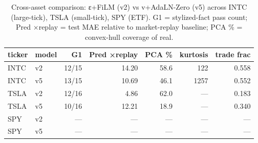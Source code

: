 \begin{table}
\caption{Cross-asset comparison: ε+FiLM (v2) vs v+AdaLN-Zero (v5) across INTC (large-tick), TSLA (small-tick), SPY (ETF). G1 = stylized-fact pass count; Pred ×replay = test MAE relative to market-replay baseline; PCA \% = convex-hull coverage of real.}
\label{tab:cross_asset}
\begin{tabular}{llrrrrr}
\toprule
ticker & model & G1 & Pred ×replay & PCA \% & kurtosis & trade frac \\
\midrule
INTC & v2 & 12/15 & 14.20 & 58.6 & 122 & 0.558 \\
INTC & v5 & 13/15 & 10.69 & 46.1 & 1257 & 0.552 \\
TSLA & v2 & 12/16 & 4.86 & 62.0 & — & 0.183 \\
TSLA & v5 & 10/16 & 12.21 & 18.9 & — & 0.340 \\
SPY & v2 & — & — & — & — & — \\
SPY & v5 & — & — & — & — & — \\
\bottomrule
\end{tabular}
\end{table}
